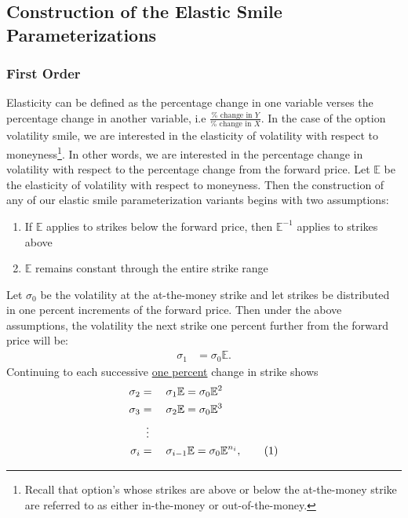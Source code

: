 \documentclass[12pt, a4paper, notitlepage]{article}
\numberwithin{equation}{subsection}
\numberwithin{figure}{subsection}
\numberwithin{table}{subsection}
\newcommand\numberthis{\addtocounter{equation}{1}\tag{\theequation}}
\newcommand{\newpar}{\newline \newline}
\begin{document}
\subsection{Construction of the Elastic Smile Parameterizations} \label{appendix:ElasticSmileDerivation}
\subsubsection{First Order} \label{subsec:FirstOrderSmileConstruction}
Elasticity can be defined as the percentage change in one variable verses the percentage change in another variable, i.e $\frac{\% \text{ change in } Y}{\% \text{ change in } X}$.  In the case of the option volatility smile, we are interested in the elasticity of volatility with respect to moneyness\footnote{Recall that option's whose strikes are above or below the at-the-money strike are referred to as either in-the-money or out-of-the-money.}.  In other words, we are interested in the percentage change in volatility with respect to the percentage change from the forward price.
\newpar
Let $\mathbb{E}$ be the elasticity of volatility with respect to moneyness.  Then the construction of any of our elastic smile parameterization variants begins with two assumptions:
\begin{enumerate}
\item If $\mathbb{E}$ applies to strikes below the forward price, then $\mathbb{E}^{-1}$ applies to strikes above \label{SkewInvertedAssumption}
\item $\mathbb{E}$ remains constant through the entire strike range
\end{enumerate}
  Let $\sigma_0$ be the volatility at the at-the-money strike and let strikes be distributed in one percent increments of the forward price.  Then under the above assumptions, the volatility the next strike one percent further from the forward price will be:
\begin{align*}
    \sigma_1 &= \sigma_0\mathbb{E}.
\end{align*}
Continuing to each successive \underline{one percent} change in strike shows
\begin{alignat*}{3}
    \sigma_2 &= &&\sigma_1\mathbb{E} = \sigma_0\mathbb{E}^{2} \\
    \sigma_3 &= &&\sigma_2\mathbb{E} = \sigma_0\mathbb{E}^{3} \\
        &\vdotswithin{=}\\
    \sigma_i &= &&\sigma_{i-1}\mathbb{E} = \sigma_0\mathbb{E}^{n_i}, \numberthis \label{eq:FirstOrderIthStrikeVol}
\end{alignat*}
\end{document}
